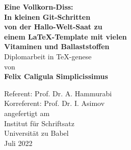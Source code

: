 \begin{titlepage}
\begin{center}
\vspace*{0.4cm}
\textbf{\LARGE
Eine Vollkorn-Diss: \\
\vspace*{0.2cm} 
In kleinen Git-Schritten \\
von der Hallo-Welt-Saat zu \\
einem LaTeX-Template mit vielen \\
Vitaminen und Ballaststoffen \\
}
\vspace*{2.5cm}
Diplomarbeit in TeX-genese\\
\vspace*{0.3cm}
von\\
\vspace*{0.3cm}
{\large \textbf{Felix Caligula Simplicissimus}}\\
\vspace*{1.5cm}

Referent: Prof. Dr.  A. Hammurabi \\
Korreferent: Prof. Dr. I. Asimov \\

\vspace*{4.8cm}
angefertigt am\\
Institut für Schriftsatz \\
Universität zu Babel \\
\vspace*{0.8cm}
Juli 2022
\end{center}

\end{titlepage}
